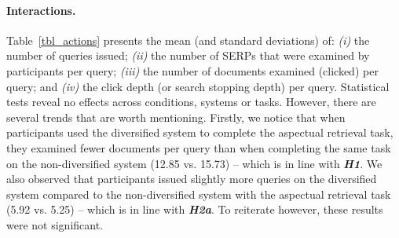 \paragraph{Interactions.} Table~\ref{tbl_actions} presents the mean (and standard deviations) of: \textit{(i)} the number of queries issued; \textit{(ii)} the number of SERPs that were examined by participants per query; \textit{(iii)} the number of documents examined (clicked) per query; and \textit{(iv)} the click depth (or search stopping depth) per query. %
Statistical tests reveal no effects across conditions, systems or tasks. However, there are several trends that are worth mentioning. Firstly, we notice that when participants used the diversified system to complete the aspectual retrieval task, they examined fewer documents per query than when completing the same task on the non-diversified system (12.85 vs. 15.73) -- which is in line with \emph{\textbf{H1}}. We also observed that participants issued slightly more queries on the diversified system compared to the non-diversified system with the aspectual retrieval task (5.92 vs. 5.25) -- which is in line with \emph{\textbf{H2a}}. To reiterate however, these results were not significant.



